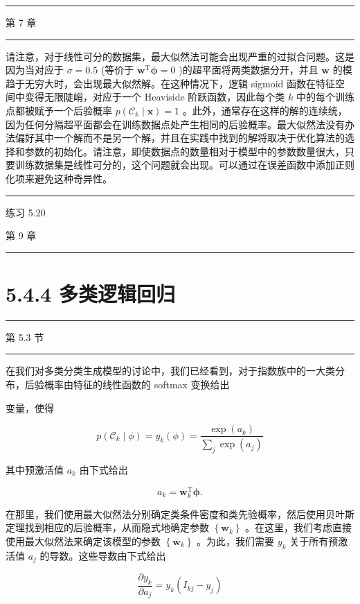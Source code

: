 \documentclass[10pt]{article}
\newcommand{\HRule}{\begin{center}\rule{0.9\linewidth}{0.2mm}\end{center}}
\begin{document}
\HRule

第 7 章

\HRule

请注意，对于线性可分的数据集，最大似然法可能会出现严重的过拟合问题。这是因为当对应于 \(\sigma  = {0.5}\) (等价于 \({\mathbf{w}}^{\mathrm{T}}\mathbf{\phi } = 0\) )的超平面将两类数据分开，并且 \(\mathbf{w}\) 的模趋于无穷大时，会出现最大似然解。在这种情况下，逻辑 sigmoid 函数在特征空间中变得无限陡峭，对应于一个 Heaviside 阶跃函数，因此每个类 \(k\) 中的每个训练点都被赋予一个后验概率 \(p\left( {{\mathcal{C}}_{k} \mid  \mathbf{x}}\right)  = 1\) 。此外，通常存在这样的解的连续统，因为任何分隔超平面都会在训练数据点处产生相同的后验概率。最大似然法没有办法偏好其中一个解而不是另一个解，并且在实践中找到的解将取决于优化算法的选择和参数的初始化。请注意，即使数据点的数量相对于模型中的参数数量很大，只要训练数据集是线性可分的，这个问题就会出现。可以通过在误差函数中添加正则化项来避免这种奇异性。

\HRule

练习 5.20

第 9 章

\HRule

\section*{5.4.4 多类逻辑回归}

\HRule

第 5.3 节

\HRule

在我们对多类分类生成模型的讨论中，我们已经看到，对于指数族中的一大类分布，后验概率由特征的线性函数的 softmax 变换给出

变量，使得

\[
p\left( {{\mathcal{C}}_{k} \mid  \phi }\right)  = {y}_{k}\left( \phi \right)  = \frac{\exp \left( {a}_{k}\right) }{\mathop{\sum }\limits_{j}\exp \left( {a}_{j}\right) } \tag{5.76}
\]

其中预激活值 \({a}_{k}\) 由下式给出

\[
{a}_{k} = {\mathbf{w}}_{k}^{\mathrm{T}}\mathbf{\phi }. \tag{5.77}
\]

在那里，我们使用最大似然法分别确定类条件密度和类先验概率，然后使用贝叶斯定理找到相应的后验概率，从而隐式地确定参数 \(\left\{  {\mathbf{w}}_{k}\right\}\) 。在这里，我们考虑直接使用最大似然法来确定该模型的参数 \(\left\{  {\mathbf{w}}_{k}\right\}\) 。为此，我们需要 \({y}_{k}\) 关于所有预激活值 \({a}_{j}\) 的导数。这些导数由下式给出

\[
\frac{\partial {y}_{k}}{\partial {a}_{j}} = {y}_{k}\left( {{I}_{kj} - {y}_{j}}\right)  \tag{5.78}
\]
\end{document}
